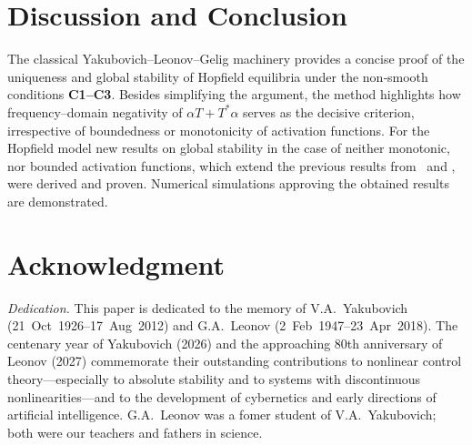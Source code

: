 \documentclass[journal]{IEEEtran}
\begin{document}





\section{Discussion and Conclusion}\label{sec:concl}
The classical Yakubovich--Leonov--Gelig machinery provides a concise proof
of the uniqueness and global stability of Hopfield equilibria under the
non‑smooth conditions \textbf{C1--C3}.  Besides simplifying the argument, the method
highlights how frequency–domain negativity of \(\alpha T+T^{\!*}\alpha\)
serves as the decisive criterion, irrespective of boundedness or monotonicity
of activation functions. For the Hopfield model new results on global stability
in the case of neither monotonic, nor bounded activation functions,
which extend the previous results from~\cite[see Theorems~1-3]{p1} 
and \cite[see Theorems~1-3]{our_paper}, 
were derived and proven.
Numerical simulations approving the obtained results are demonstrated.

\section*{Acknowledgment}

\noindent\textit{Dedication.} 
This paper is dedicated to the memory of V.A.~Yakubovich (21~Oct~1926--17~Aug~2012) 
and G.A.~Leonov (2~Feb~1947--23~Apr~2018). 
The centenary year of Yakubovich (2026) and the approaching 80th anniversary of Leonov (2027) 
commemorate their outstanding contributions to nonlinear control theory---especially to absolute stability and to systems with discontinuous nonlinearities---and to the development of cybernetics and early directions of artificial intelligence. 
G.A.~Leonov was a fomer student of V.A.~Yakubovich; both were our teachers and fathers in science.
\end{document}
